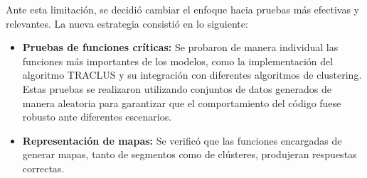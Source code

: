 Ante esta limitación, se decidió cambiar el enfoque hacia pruebas más efectivas y relevantes. La nueva estrategia consistió en lo siguiente:

\begin{itemize}
    \item \textbf{Pruebas de funciones críticas:} Se probaron de manera individual las funciones más importantes de los modelos, como la implementación del algoritmo TRACLUS y su integración con diferentes algoritmos de clustering. Estas pruebas se realizaron utilizando conjuntos de datos generados de manera aleatoria para garantizar que el comportamiento del código fuese robusto ante diferentes escenarios.
    \item \textbf{Representación de mapas:} Se verificó que las funciones encargadas de generar mapas, tanto de segmentos como de clústeres, produjeran respuestas correctas. 
\end{itemize}